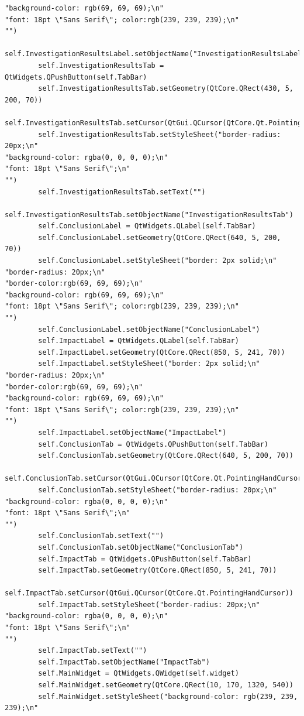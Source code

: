 \documentclass{article}
\begin{document}
\begin{lstlisting}
"background-color: rgb(69, 69, 69);\n"
"font: 18pt \"Sans Serif\"; color:rgb(239, 239, 239);\n"
"")
        self.InvestigationResultsLabel.setObjectName("InvestigationResultsLabel")
        self.InvestigationResultsTab = QtWidgets.QPushButton(self.TabBar)
        self.InvestigationResultsTab.setGeometry(QtCore.QRect(430, 5, 200, 70))
        self.InvestigationResultsTab.setCursor(QtGui.QCursor(QtCore.Qt.PointingHandCursor))
        self.InvestigationResultsTab.setStyleSheet("border-radius: 20px;\n"
"background-color: rgba(0, 0, 0, 0);\n"
"font: 18pt \"Sans Serif\";\n"
"")
        self.InvestigationResultsTab.setText("")
        self.InvestigationResultsTab.setObjectName("InvestigationResultsTab")
        self.ConclusionLabel = QtWidgets.QLabel(self.TabBar)
        self.ConclusionLabel.setGeometry(QtCore.QRect(640, 5, 200, 70))
        self.ConclusionLabel.setStyleSheet("border: 2px solid;\n"
"border-radius: 20px;\n"
"border-color:rgb(69, 69, 69);\n"
"background-color: rgb(69, 69, 69);\n"
"font: 18pt \"Sans Serif\"; color:rgb(239, 239, 239);\n"
"")
        self.ConclusionLabel.setObjectName("ConclusionLabel")
        self.ImpactLabel = QtWidgets.QLabel(self.TabBar)
        self.ImpactLabel.setGeometry(QtCore.QRect(850, 5, 241, 70))
        self.ImpactLabel.setStyleSheet("border: 2px solid;\n"
"border-radius: 20px;\n"
"border-color:rgb(69, 69, 69);\n"
"background-color: rgb(69, 69, 69);\n"
"font: 18pt \"Sans Serif\"; color:rgb(239, 239, 239);\n"
"")
        self.ImpactLabel.setObjectName("ImpactLabel")
        self.ConclusionTab = QtWidgets.QPushButton(self.TabBar)
        self.ConclusionTab.setGeometry(QtCore.QRect(640, 5, 200, 70))
        self.ConclusionTab.setCursor(QtGui.QCursor(QtCore.Qt.PointingHandCursor))
        self.ConclusionTab.setStyleSheet("border-radius: 20px;\n"
"background-color: rgba(0, 0, 0, 0);\n"
"font: 18pt \"Sans Serif\";\n"
"")
        self.ConclusionTab.setText("")
        self.ConclusionTab.setObjectName("ConclusionTab")
        self.ImpactTab = QtWidgets.QPushButton(self.TabBar)
        self.ImpactTab.setGeometry(QtCore.QRect(850, 5, 241, 70))
        self.ImpactTab.setCursor(QtGui.QCursor(QtCore.Qt.PointingHandCursor))
        self.ImpactTab.setStyleSheet("border-radius: 20px;\n"
"background-color: rgba(0, 0, 0, 0);\n"
"font: 18pt \"Sans Serif\";\n"
"")
        self.ImpactTab.setText("")
        self.ImpactTab.setObjectName("ImpactTab")
        self.MainWidget = QtWidgets.QWidget(self.widget)
        self.MainWidget.setGeometry(QtCore.QRect(10, 170, 1320, 540))
        self.MainWidget.setStyleSheet("background-color: rgb(239, 239, 239);\n"

\end{lstlisting}
\end{document}
